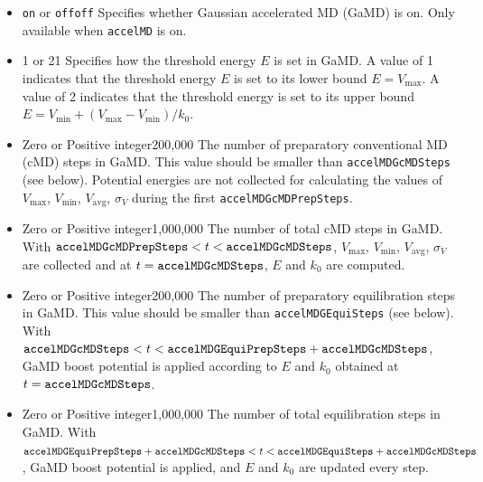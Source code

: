 \begin{itemize}

\item
{}
{{\tt on} or {\tt off}}{{\tt off}}
{Specifies whether Gaussian accelerated MD (GaMD) is on. Only available when {\tt accelMD} is on. 
}

\item
{}
{1 or 2}{1}
{Specifies how the threshold energy $E$ is set in GaMD. A value of 1 indicates that the threshold energy $E$ is set to its lower bound $E = V_\text{max}$. A value of 2 indicates that the threshold energy is set to its upper bound $E = V_\text{min} + (V_\text{max} - V_\text{min}) / k_0.$
}

\item
{}
{Zero or Positive integer}{200,000}
{The number of preparatory conventional MD (cMD) steps in GaMD. This value should be smaller than {\tt accelMDGcMDSteps} (see below). Potential energies are not collected for calculating the values of $V_\text{max}$, $V_\text{min}$, $V_\text{avg}$, $\sigma_V$ during the first {\tt accelMDGcMDPrepSteps}. 
}

\item
{}
{Zero or Positive integer}{1,000,000}
{The number of total cMD steps in GaMD. With ${\tt accelMDGcMDPrepSteps} < t < {\tt accelMDGcMDSteps}$, $V_\text{max}$, $V_\text{min}$, $V_\text{avg}$, $\sigma_V$ are collected and at $t = {\tt accelMDGcMDSteps}$, $E$ and $k_0$ are computed.
}

\item
{}
{Zero or Positive integer}{200,000}
{The number of preparatory equilibration steps in GaMD. This value should be smaller than {\tt accelMDGEquiSteps} (see below). With ${\tt accelMDGcMDSteps} < t < {\tt accelMDGEquiPrepSteps}+{\tt accelMDGcMDSteps}$, GaMD boost potential is applied according to $E$ and $k_0$ obtained at $t={\tt accelMDGcMDSteps}$. 
}

\item
{}
{Zero or Positive integer}{1,000,000}
{The number of total equilibration steps in GaMD. With ${\tt accelMDGEquiPrepSteps}+{\tt accelMDGcMDSteps} < t < {\tt accelMDGEquiSteps} +{\tt accelMDGcMDSteps}$, GaMD boost potential is applied, and $E$ and $k_0$ are updated every step.
}


\end{itemize}
